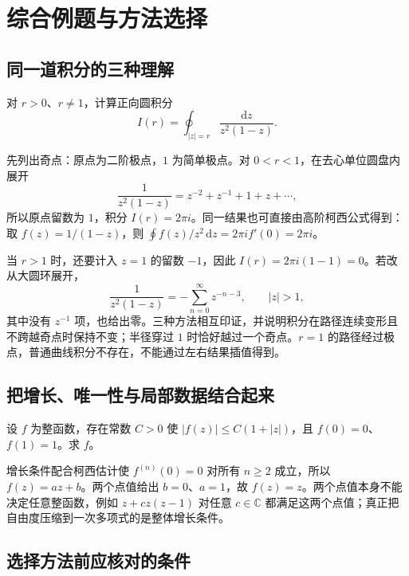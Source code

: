 \setcounter{chapter}{2} %
\chapter{综合例题与方法选择}
\label{chap:ca-synthesis}

\section{同一道积分的三种理解}

\begin{example}[路径半径改变时发生了什么]
对 $r>0$、$r\ne1$，计算正向圆积分
\[
 I(r)=\oint_{|z|=r}\frac{\mathrm dz}{z^2(1-z)}.
\]
\end{example}
\begin{solve}
先列出奇点：原点为二阶极点，$1$ 为简单极点。对 $0<r<1$，在去心单位圆盘内展开
\[
 \frac1{z^2(1-z)}=z^{-2}+z^{-1}+1+z+\cdots,
\]
所以原点留数为 $1$，积分 $I(r)=2\pi i$。同一结果也可直接由高阶柯西公式得到：取 $f(z)=1/(1-z)$，则 $\oint f(z)/z^2\,\mathrm dz=2\pi i f'(0)=2\pi i$。

当 $r>1$ 时，还要计入 $z=1$ 的留数 $-1$，因此 $I(r)=2\pi i(1-1)=0$。若改从大圆环展开，
\[
 \frac1{z^2(1-z)}=-\sum_{n=0}^\infty z^{-n-3},\qquad |z|>1,
\]
其中没有 $z^{-1}$ 项，也给出零。三种方法相互印证，并说明积分在路径连续变形且不跨越奇点时保持不变；半径穿过 $1$ 时恰好越过一个奇点。$r=1$ 的路径经过极点，普通曲线积分不存在，不能通过左右结果插值得到。
\end{solve}

\section{把增长、唯一性与局部数据结合起来}

\begin{example}[少量数据何时决定整个函数]
设 $f$ 为整函数，存在常数 $C>0$ 使 $|f(z)|\le C(1+|z|)$，且 $f(0)=0$、$f(1)=1$。求 $f$。
\end{example}
\begin{solve}
增长条件配合柯西估计使 $f^{(n)}(0)=0$ 对所有 $n\ge2$ 成立，所以 $f(z)=az+b$。两个点值给出 $b=0$、$a=1$，故 $f(z)=z$。两个点值本身不能决定任意整函数，例如 $z+cz(z-1)$ 对任意 $c\in\mathbb C$ 都满足这两个点值；真正把自由度压缩到一次多项式的是整体增长条件。
\end{solve}

\section{选择方法前应核对的条件}

